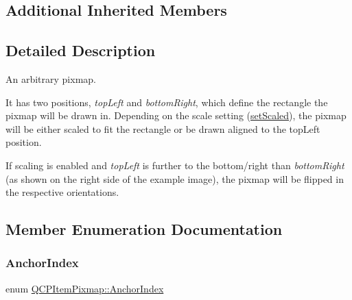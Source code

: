 \subsection*{Additional Inherited Members}


\subsection{Detailed Description}
An arbitrary pixmap. 

 It has two positions, {\itshape top\+Left} and {\itshape bottom\+Right}, which define the rectangle the pixmap will be drawn in. Depending on the scale setting (\hyperlink{class_q_c_p_item_pixmap_ab4d44529a1c6c8d37d0ea7560e042777}{set\+Scaled}), the pixmap will be either scaled to fit the rectangle or be drawn aligned to the top\+Left position.

If scaling is enabled and {\itshape top\+Left} is further to the bottom/right than {\itshape bottom\+Right} (as shown on the right side of the example image), the pixmap will be flipped in the respective orientations. 

\subsection{Member Enumeration Documentation}
\mbox{\label{class_q_c_p_item_pixmap_a0ea7f65edb7395e02de521915f221174}} 
\subsubsection{\texorpdfstring{Anchor\+Index}{AnchorIndex}}
{\footnotesize\ttfamily enum \hyperlink{class_q_c_p_item_pixmap_a0ea7f65edb7395e02de521915f221174}{Q\+C\+P\+Item\+Pixmap\+::\+Anchor\+Index}\hspace{0.3cm}{\ttfamily [protected]}}

